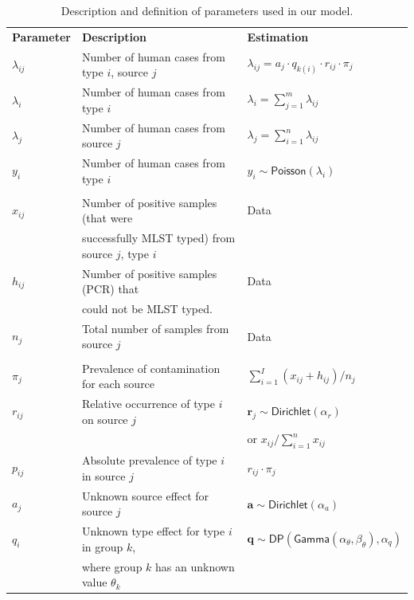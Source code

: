\begin{table}[H] %
\caption{Description and definition of parameters used in our model.}\label{table_params}
\setlength{\tabcolsep}{4pt}
\bigskip{}
\centering
\label{table:HaldModelParams}
\begin{tabular}{lll}
\multicolumn{1}{l}{\textbf{Parameter}} & \multicolumn{1}{l}{\textbf{Description}} & \multicolumn{1}{l}{\textbf{Estimation}}\\
$\lambda_{ij}$ & Number of human cases from type $i$, source $j$ & $\lambda_{ij}=a_{j}\cdot q_{k(i)}\cdot r_{ij}\cdot \pi_{j}$\\
$\lambda_{i}$ & Number of human cases from type $i$ & $\lambda_{i}=\sum_{j=1}^{m}\lambda_{ij}$\\
$\lambda_{j}$ & Number of human cases from source $j$ & $\lambda_{j}=\sum_{i=1}^{n}\lambda_{ij}$\\
$y_{i}$ & Number of human cases from type $i$ & $y_{i}\sim \textsf{Poisson}(\lambda_{i})$\\
&&\\
$x_{ij}$ & Number of positive samples (that were & Data\\
& successfully MLST typed) from source $j$, type $i$ & \\
$h_{ij}$  & Number of positive samples (PCR) that & Data\\
& could not be MLST typed. & \\
$n_{j}$ & Total number of samples from source $j$ & Data\\
 &&\\
$\pi_{j}$ & Prevalence of contamination for each source & $\sum_{i=1}^{I}(x_{ij}+h_{ij})/n_{j}$\\
$r_{ij}$ & Relative occurrence of type $i$ on source $j$ & $\mathbf{r}_j\sim \textsf{Dirichlet}(\alpha_r)$\\
& & or $x_{ij}/\sum_{i=1}^{n}x_{ij}$\\
$p_{ij}$ & Absolute prevalence of type $i$ in source $j$ & $r_{ij}\cdot \pi_{j}$\\
$a_{j}$ & Unknown source effect for source $j$ & $\mathbf{a}\sim \textsf{Dirichlet}(\alpha_a)$\\
$q_{i}$ & Unknown type effect for type $i$ in group $k$,& $\mathbf{q}\sim \textsf{DP}(\textsf{Gamma}(\alpha_{\theta}, \beta_{\theta}), \alpha_q)$\\
 & where group $k$ has an unknown value $\theta_k$ &\\
\end{tabular}\\
\end{table}

